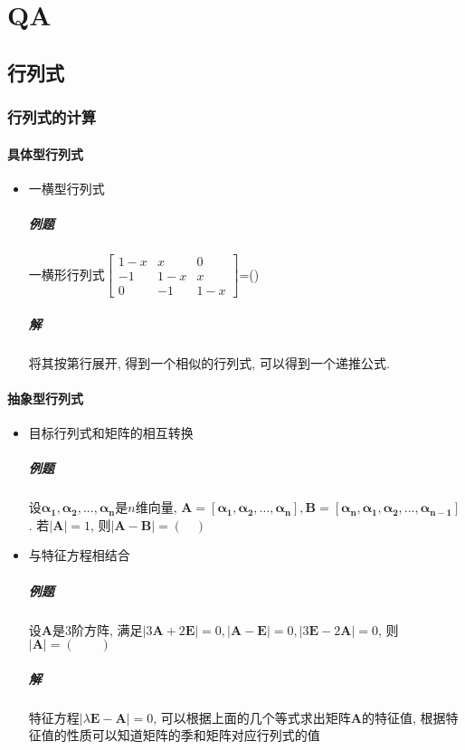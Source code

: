 \chapter{QA}
\section{行列式}
\subsection{行列式的计算}
\subsubsection{具体型行列式}
\begin{itemize}
\item 一横型行列式 \label{一横型行列式}
\paragraph{例题} 一横形行列式$
\begin{bmatrix}
1-x & x & 0 \\
-1 & 1-x & x \\
0 & -1 & 1-x
\end{bmatrix}$=(\qquad)
\paragraph{解} 将其按第行展开, 得到一个相似的行列式, 可以得到一个递推公式.
\end{itemize}
\subsubsection{抽象型行列式}
\begin{itemize}
\item 目标行列式和矩阵的相互转换 \label{目标行列式和矩阵的相互转换}
\paragraph{例题} 设$\bm{\alpha_{1}},\bm{\alpha_{2}},...,\bm{\alpha_{n}}$是$n$维向量, $\bm{A}=[\bm{\alpha_{1}},\bm{\alpha_{2}},...,\bm{\alpha_{n}}],\bm{B}=[\bm{\alpha_{n}},\bm{\alpha_{1}},\bm{\alpha_{2}},...,\bm{\alpha_{n-1}}]$. 若$|\bm{A}|=1$, 则$|\bm{A}-\bm{B}|=(\quad)$\par
\item 与特征方程相结合 \label{与特征方程相结合}
\paragraph{例题} 设$\bm{A}$是$ 3 $阶方阵, 满足$ |3 \bm{A}+2 \bm{E}|=0, |\bm{A} - \bm{E}|=0, |3 \bm{E}-2 \bm{A}|=0 $, 则$ |\bm{A}|=(\qquad) $
\paragraph{解} 特征方程$ |\lambda \bm{E}-\bm{A}|=0 $, 可以根据上面的几个等式求出矩阵$ \bm{A} $的特征值, 根据特征值的性质可以知道矩阵的季和矩阵对应行列式的值
\end{itemize}
